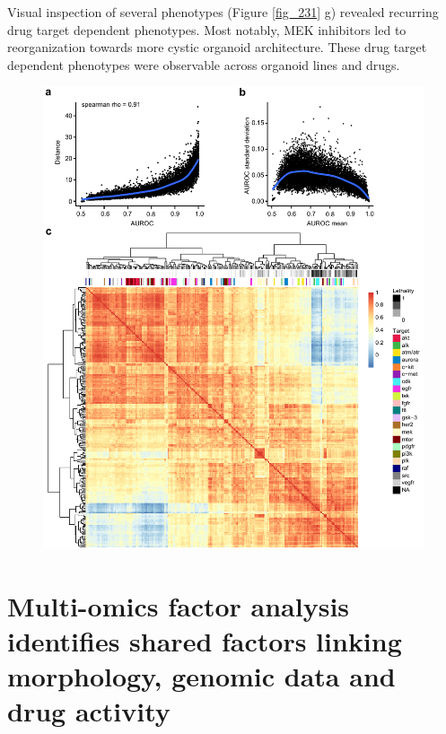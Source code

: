 \begin{flushleft}
\bigbreak
Visual inspection of several phenotypes (Figure \ref{fig_231} g) revealed recurring drug target dependent phenotypes. Most notably, MEK inhibitors led to reorganization towards more cystic organoid architecture. These drug target dependent phenotypes were observable across organoid lines and drugs.

\begin{figure}[h!]
\centering
\includegraphics[width=\textwidth,
                height=\textheight,
                keepaspectratio]{figures/promise/pdf/fig_3_2.pdf}
\caption{}
\label{fig_232}
\end{figure}
\bigbreak




\newpage

\section{Multi-omics factor analysis identifies shared factors linking morphology, genomic data and drug activity}


\end{flushleft}
